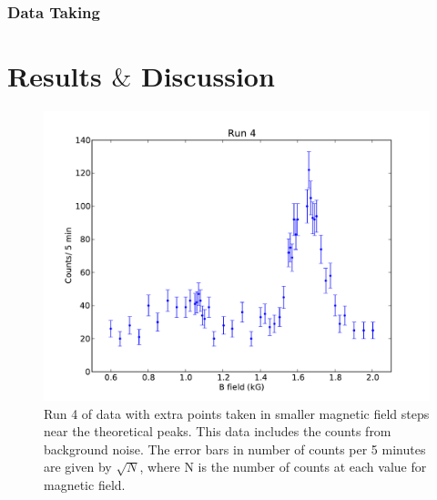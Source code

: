 \subsubsection{Data Taking}


\section{Results $\&$ Discussion}

\begin{figure}[H]
\begin{center}
\includegraphics[width=6 in]{figure3.pdf}
\caption{Run 4 of data with extra points taken in smaller magnetic field steps near the theoretical peaks. This data includes the counts from background noise. The error bars in number of counts per 5 minutes are given by $\sqrt{N}$, where N is the number of counts at each value for magnetic field.}
\end{center}
\end{figure}
